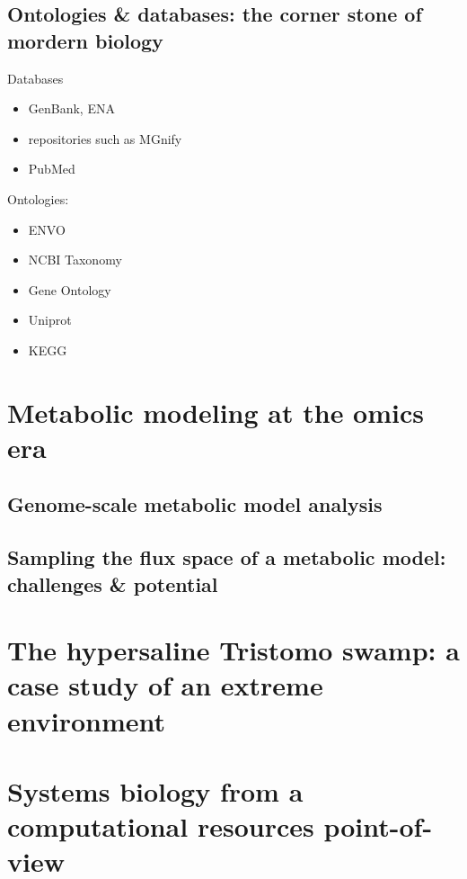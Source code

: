 \subsection{Ontologies \& databases: the corner stone of mordern biology}


Databases

\begin{itemize}
   \item GenBank, ENA
   \item repositories such as MGnify 
   \item PubMed
\end{itemize}


Ontologies: 

\begin{itemize}
   \item ENVO
   \item NCBI Taxonomy 
   \item Gene Ontology 
   \item Uniprot
   \item KEGG
\end{itemize}



\section{Metabolic modeling at the omics era}


\subsection{Genome-scale metabolic model analysis}


\subsection{Sampling the flux space of a metabolic model: challenges \& potential}



\section{The hypersaline Tristomo swamp: a case study of an extreme environment}


\section{Systems biology from a computational resources point-of-view}





